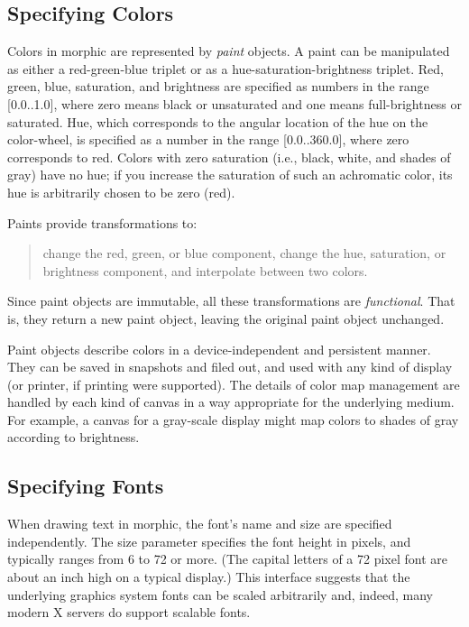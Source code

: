 \documentclass[letterpaper,10pt,english]{sphinxmanual}
\begin{document}
\subsection{Specifying Colors}
\label{morphic:specifying-colors}
Colors in morphic are represented by \emph{paint} objects. A paint can be manipulated as either a red-green-blue triplet or as a hue-saturation-brightness triplet. Red, green, blue, saturation, and brightness are specified as numbers in the range {[}0.0..1.0{]}, where zero means black or unsaturated and one means full-brightness or saturated. Hue, which corresponds to the angular location of the hue on the color-wheel, is specified as a number in the range {[}0.0..360.0{]}, where zero corresponds to red. Colors with zero saturation (i.e., black, white, and shades of gray) have no hue; if you increase the saturation of such an achromatic color, its hue is arbitrarily chosen to be zero (red).

Paints provide transformations to:
\begin{quote}

change the red, green, or blue component,
change the hue, saturation, or brightness component, and
interpolate between two colors.
\end{quote}

Since paint objects are immutable, all these transformations are \emph{functional}. That is, they return a new paint object, leaving the original paint object unchanged.

Paint objects describe colors in a device-independent and persistent manner. They can be saved in snapshots and filed out, and used with any kind of display (or printer, if printing were supported). The details of color map management are handled by each kind of canvas in a way appropriate for the underlying medium. For example, a canvas for a gray-scale display might map colors to shades of gray according to brightness.


\subsection{Specifying Fonts}
\label{morphic:specifying-fonts}
When drawing text in morphic, the font's name and size are specified independently. The size parameter specifies the font height in pixels, and typically ranges from 6 to 72 or more. (The capital letters of a 72 pixel font are about an inch high on a typical display.) This interface suggests that the underlying graphics system fonts can be scaled arbitrarily and, indeed, many modern X servers do support scalable fonts.
\end{document}
